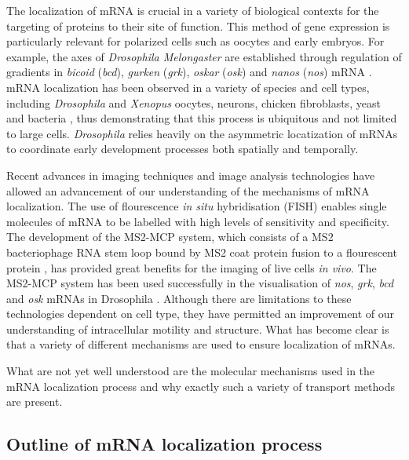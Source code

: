 \documentclass[twocolumn]{biophys}
\begin{document}
The localization of mRNA is crucial in a variety of biological contexts for the targeting of proteins to their site of function.
This method of gene expression is particularly relevant for polarized cells such as oocytes and early embryos.
For example, the axes of \textit{Drosophila Melongaster} are established through regulation of gradients in \textit{bicoid} (\textit{bcd}), \textit{gurken} (\textit{grk}), \textit{oskar} (\textit{osk}) and \textit{nanos} (\textit{nos}) mRNA \citep{wolpert1998}.
mRNA localization has been observed in a variety of species and cell types, including \textit{Drosophila} and \textit{Xenopus} oocytes, neurons, chicken fibroblasts, yeast and bacteria \citep{wilkie2001drosophila, bobola1996asymmetric, mowry1992vegetal, rosbash1993rna, nevo2011translation}, thus demonstrating that this process is ubiquitous and not limited to large cells. 
\textit{Drosophila} relies heavily on the asymmetric locatization of mRNAs to coordinate early development processes both spatially and temporally.

Recent advances in imaging techniques and image analysis technologies \citep{jeffery1983localization, bertrand1998localization, hamilton2010particlestats} have allowed an advancement of our understanding of the mechanisms of mRNA localization. 
The use of flourescence \textit{in situ} hybridisation (FISH) enables single molecules of mRNA to be labelled with high levels of sensitivity and specificity. 
The development of the MS2-MCP system, which consists of a MS2 bacteriophage RNA stem loop bound by MS2 coat protein fusion to a flourescent protein \citep{parton2014subcellular}, has provided great benefits for the imaging of live cells \textit{in vivo}.
The MS2-MCP system has been used successfully in the visualisation of \textit{nos}, \textit{grk}, \textit{bcd} and \textit{osk} mRNAs in Drosophila \citep{forrest2003live, jaramillo2008dynamics, weil2006localization, zimyanin2008vivo}.
Although there are limitations to these technologies dependent on cell type, they have permitted an improvement of our understanding of intracellular motility and structure.
What has become clear is that a variety of different mechanisms are used to ensure localization of mRNAs.

What are not yet well understood are the molecular mechanisms used in the mRNA localization process and why exactly such a variety of transport methods are present.

\subsection{Outline of mRNA localization process}
\end{document}
